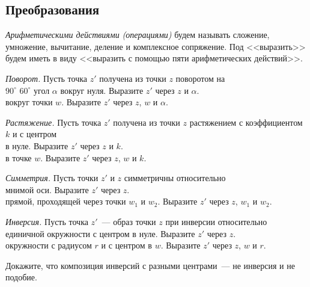 

\subsection*{Преобразования}

\emph{Арифметическими действиями}
\emph{(операциями)}
будем называть сложение, умножение, вычитание, деление и комплексное
сопряжение.
Под <<выразить>> будем иметь в виду
<<выразить с помощью пяти арифметических действий>>.

\begin{problems}

\item
\emph{Поворот.}
Пусть точка $z'$ получена из точки $z$ поворотом на
\\
\sbp
$90^\circ$
\quad
\sbp
$60^\circ$
\quad
\sbp
угол $\alpha$
\quad
вокруг нуля. Выразите $z'$ через $z$ и $\alpha$.
\\
\sbp вокруг точки $w$.  Выразите $z'$ через $z$, $w$ и $\alpha$.

\item
\emph{Растяжение.}
Пусть точка $z'$ получена из точки $z$ растяжением с коэффициентом $k$ и с
центром
\\
\sbp в нуле. Выразите $z'$ через $z$ и $k$.
\\
\sbp в точке $w$. Выразите $z'$ через $z$, $w$ и $k$.

\item
\emph{Симметрия.}
Пусть точки $z'$ и $z$ симметричны относительно
\\
\sbp
мнимой оси.
Выразите $z'$ через $z$.
\\
\sbp
прямой, проходящей через точки $w_1$ и $w_2$.
Выразите $z'$ через $z$, $w_1$ и $w_2$.

\item
\emph{Инверсия.}
Пусть точка $z'$~--- образ точки $z$ при инверсии относительно
\\
\sbp
единичной окружности с центром в нуле.
Выразите $z'$ через $z$.
\\
\sbp
окружности с радиусом $r$ и с центром в $w$.
Выразите $z'$ через $z$, $w$ и $r$.

\item
Докажите, что композиция инверсий с разными центрами~--- не инверсия и не
подобие.

\end{problems}

